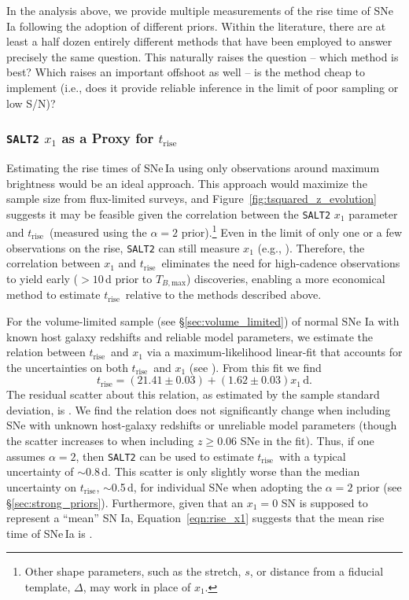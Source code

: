 \documentclass[twocolumn]{./aastex63}
\newcommand{\trise}{$t_\mathrm{rise}$}
\newcommand{\tbmax}{$T_{B,\mathrm{max}}$}
\begin{document}
In the analysis above, we provide multiple measurements of the rise time of SNe
Ia following the adoption of different priors. Within the literature, there are
at least a half dozen entirely different methods that have been employed to
answer precisely the same question. This naturally raises the question -- which
method is best? Which raises an important offshoot as well -- is the method
cheap to implement (i.e., does it provide reliable inference in the limit of
poor sampling or low S/N)?

\subsubsection{\texttt{SALT2} $x_1$ as a Proxy for \trise}\label{sec:x1_rise}

Estimating the rise times of SNe\,Ia using only observations around maximum
brightness would be an ideal approach. This approach would maximize the sample
size from flux-limited surveys, and Figure~\ref{fig:tsquared_z_evolution}
suggests it may be feasible given the correlation between the \texttt{SALT2}
$x_1$ parameter and \trise\ (measured using the $\alpha = 2$
prior).\footnote{Other shape parameters, such as the stretch, $s$, or distance
from a fiducial template, $\Delta$, may work in place of $x_1$.} Even in the
limit of only one or a few observations on the rise, \texttt{SALT2} can still
measure $x_1$ (e.g., \citealt{Scolnic18a}). Therefore, the correlation between
$x_1$ and \trise\ eliminates the need for high-cadence observations to yield
early ($> 10$\,d prior to \tbmax) discoveries, enabling a more economical
method to estimate \trise\ relative to the methods described above.

For the volume-limited sample (see \S\ref{sec:volume_limited}) of normal SNe
Ia with known host galaxy redshifts and reliable model parameters, we estimate
the relation between \trise\ and $x_1$ via a maximum-likelihood linear-fit
that accounts for the uncertainties on both \trise\ and $x_1$ (see
\citealt{Hogg10}). From this fit we find
%
\begin{equation}
    t_\mathrm{rise} = (21.41 \pm 0.03) + (1.62 \pm 0.03)x_1\,\mathrm{d}.
    \label{eqn:rise_x1}
\end{equation} 
%
The residual scatter about this relation, as estimated by the sample standard
deviation, is . We find the relation does not significantly
change when including SNe with unknown host-galaxy redshifts or unreliable
model parameters (though the scatter increases to  when
including $z \ge 0.06$ SNe in the fit). Thus, if one assumes $\alpha = 2$,
then \texttt{SALT2} can be used to estimate \trise\ with a typical uncertainty
of $\sim$0.8\,d. This scatter is only slightly worse than the median
uncertainty on \trise, $\sim$0.5\,d, for individual SNe when adopting the
$\alpha = 2$ prior (see \S\ref{sec:strong_priors}). Furthermore, given that an
$x_1 = 0$ SN is supposed to represent a ``mean'' SN Ia,
Equation~\ref{eqn:rise_x1} suggests that the mean rise time of SNe\,Ia is
.
\end{document}
